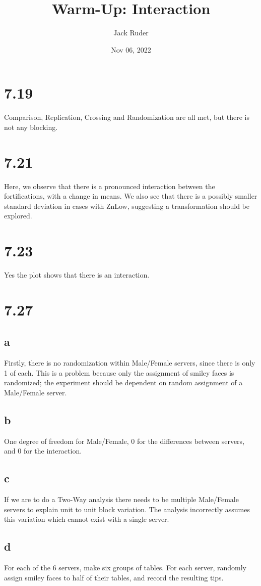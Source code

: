 \documentclass[a4paper]{article}
\title{Warm-Up: Interaction}
\date{Nov 06, 2022}
\author{Jack Ruder}
\begin{document}
\doublespacing
\maketitle

\section*{7.19}%
\label{sec:7.19}
Comparison, Replication, Crossing and Randomization are all met, but there is not any blocking.

\section*{7.21}
Here, we observe that there is a pronounced interaction between the fortifications, with a change in means. We also see that there is a possibly smaller standard deviation in cases with ZnLow, suggesting a transformation should be explored. 

\section*{7.23}%
\label{sec:7.23}
Yes the plot shows that there is an interaction.

\section*{7.27}

\subsection*{a}
Firstly, there is no randomization within Male/Female servers, since there is only 1 of each. This is a problem because only the assignment  of smiley faces is randomized; the experiment should be dependent on random assignment of a Male/Female server.

\subsection*{b}
 One degree of freedom for Male/Female, 0 for the differences between servers, and 0 for the interaction.

 \subsection*{c}%
 \label{sub:c}
If we are to do a Two-Way analysis there needs to be multiple Male/Female servers to explain unit to unit block variation. The analysis incorrectly assumes this variation which cannot exist with a single server.

\subsection*{d}
For each of the 6 servers, make six groups of tables. For each server, randomly assign smiley faces to half of their tables, and record the resulting tips.
\end{document}
